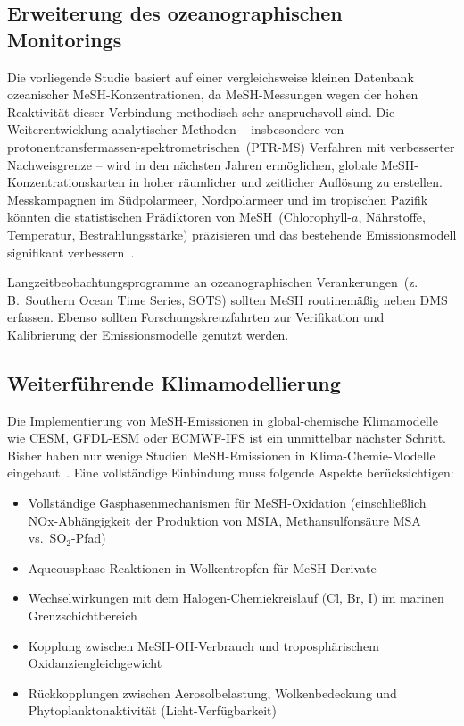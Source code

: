 ﻿\documentclass[a4paper,12pt]{article}
\theoremstyle{definition}
\begin{document}
\subsection{Erweiterung des ozeanographischen Monitorings}

Die vorliegende Studie basiert auf einer vergleichsweise kleinen Datenbank ozeanischer
MeSH-Konzentrationen, da MeSH-Messungen wegen der hohen Reaktivität dieser Verbindung
methodisch sehr anspruchsvoll sind. Die Weiterentwicklung analytischer Methoden -- insbesondere
von protonentransfermassen-spektrometrischen~(PTR-MS) Verfahren mit verbesserter Nachweisgrenze --
wird in den nächsten Jahren ermöglichen, globale MeSH-Konzentrationskarten in hoher räumlicher
und zeitlicher Auflösung zu erstellen. Messkampagnen im Südpolarmeer, Nordpolarmeer und im
tropischen Pazifik könnten die statistischen Prädiktoren von MeSH~(Chlorophyll-$a$, Nährstoffe,
Temperatur, Bestrahlungsstärke) präzisieren und das bestehende Emissionsmodell signifikant
verbessern~\cite{wohl2024, kettle1999}.

Langzeitbeobachtungsprogramme an ozeanographischen Verankerungen~(z.\,B.\ Southern Ocean
Time Series, SOTS) sollten MeSH routinemäßig neben DMS erfassen. Ebenso sollten
Forschungskreuzfahrten zur Verifikation und Kalibrierung der Emissionsmodelle genutzt werden.

\subsection{Weiterführende Klimamodellierung}

Die Implementierung von MeSH-Emissionen in global-chemische Klimamodelle wie CESM, GFDL-ESM
oder ECMWF-IFS ist ein unmittelbar nächster Schritt. Bisher haben nur wenige Studien
MeSH-Emissionen in Klima-Chemie-Modelle eingebaut~\cite{wohl2024, pham2005}. Eine vollständige
Einbindung muss folgende Aspekte berücksichtigen:

\begin{itemize}
  \item Vollständige Gasphasenmechanismen für MeSH-Oxidation (einschließlich NOx-Abhängigkeit
        der Produktion von MSIA, Methansulfonsäure MSA vs.\ SO$_2$-Pfad)
  \item Aqueousphase-Reaktionen in Wolkentropfen für MeSH-Derivate
  \item Wechselwirkungen mit dem Halogen-Chemiekreislauf (Cl, Br, I) im marinen Grenzschichtbereich
  \item Kopplung zwischen MeSH-OH-Verbrauch und troposphärischem Oxidanziengleichgewicht
  \item Rückkopplungen zwischen Aerosolbelastung, Wolkenbedeckung und Phytoplanktonaktivität
        (Licht-Verfügbarkeit)
\end{itemize}
\end{document}
